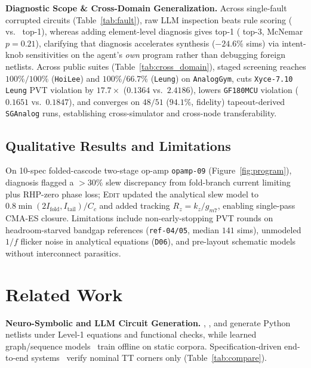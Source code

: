 \documentclass{article}
\theoremstyle{plain}
\begin{document}
\textbf{Diagnostic Scope \& Cross-Domain Generalization.} Across \FaultN{} single-fault corrupted circuits (Table~\ref{tab:fault}), raw LLM inspection beats rule scoring (\FaultRawTopOne{} vs.\ \FaultRuleTopOne{} top-1), whereas adding element-level diagnosis gives \FaultDiagTopOne{} top-1 (\FaultDiagTopThree{} top-3, McNemar $p=0.21$), clarifying that diagnosis accelerates synthesis ($-24.6\%$ sims) via intent-knob sensitivities on the agent's \emph{own} program rather than debugging foreign netlists. Across public suites (Table~\ref{tab:cross_domain}), staged screening reaches $100\%/100\%$ (\texttt{HoiLee}) and $100\%/66.7\%$ (\texttt{Leung}) on \texttt{AnalogGym}, cuts \texttt{Xyce-7.10} \texttt{Leung} PVT violation by $17.7\times$ ($0.1364$ vs.\ $2.4186$), lowers \texttt{GF180MCU} violation ($0.1651$ vs.\ $0.1847$), and converges on $48/51$ ($94.1\%$, \SGAnalogFidelity{} fidelity) tapeout-derived \texttt{SGAnalog} runs, establishing cross-simulator and cross-node transferability.

\subsection{Qualitative Results and Limitations}
On 10-spec folded-cascode two-stage op-amp \texttt{opamp-09} (Figure~\ref{fig:program}), diagnosis flagged a $>30\%$ slew discrepancy from fold-branch current limiting plus RHP-zero phase loss; \textsc{Edit} updated the analytical slew model to $0.8\min(2I_{\text{fold}}, I_{\text{tail}})/C_c$ and added tracking $R_z = k_z/g_{m7}$, enabling single-pass CMA-ES closure. Limitations include non-early-stopping PVT rounds on headroom-starved bandgap references (\texttt{ref-04/05}, median $141$ sims), unmodeled $1/f$ flicker noise in analytical equations (\texttt{D06}), and pre-layout schematic models without interconnect parasitics.

\section{Related Work}
\label{sec:related}


\textbf{Neuro-Symbolic and LLM Circuit Generation.} \citet{lai2025analogcoder}, \citet{bao2026analogagent}, and \citet{chen2025menter} generate Python netlists under Level-1 equations and functional checks, while learned graph/sequence models~\citep{dong2023cktgnn,chang2024lamagic,chang2025lamagic2,gao2025analoggenie,mehradfar2025falcon} train offline on static corpora. Specification-driven end-to-end systems~\citep{lai2026analogcoderpro,wang2025analogsage,habib2026aallm,huang2026saftac,zhang2026panda,shen2026atelier} verify nominal TT corners only (Table~\ref{tab:compare}).
\end{document}
